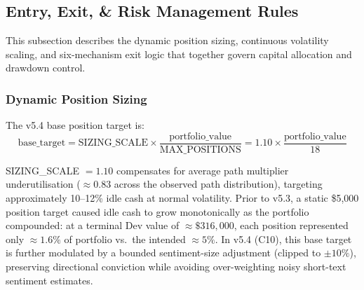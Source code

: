 \documentclass[11pt,twoside,a4paper]{article}
\begin{document}
\subsection{Entry, Exit, \& Risk Management Rules}

This subsection describes the dynamic position sizing, continuous volatility scaling, and six-mechanism exit logic that together govern capital allocation and drawdown control.

\subsubsection{Dynamic Position Sizing}

The v5.4 base position target is:
\[
\text{base\_target} = \text{SIZING\_SCALE} \times \frac{\text{portfolio\_value}}{\text{MAX\_POSITIONS}} = 1.10 \times \frac{\text{portfolio\_value}}{18}
\]

SIZING\_SCALE $= 1.10$ compensates for average path multiplier underutilisation ($\approx 0.83$ across the observed path distribution), targeting approximately 10--12\% idle cash at normal volatility. Prior to v5.3, a static \$5,000 position target caused idle cash to grow monotonically as the portfolio compounded: at a terminal Dev value of $\approx\$316{,}000$, each position represented only $\approx 1.6\%$ of portfolio vs.\ the intended $\approx 5\%$. In v5.4 (C10), this base target is further modulated by a bounded sentiment-size adjustment (clipped to $\pm 10\%$), preserving directional conviction while avoiding over-weighting noisy short-text sentiment estimates.
\end{document}
